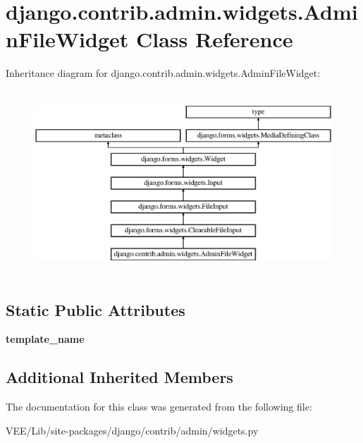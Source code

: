 \hypertarget{classdjango_1_1contrib_1_1admin_1_1widgets_1_1_admin_file_widget}{}\section{django.\+contrib.\+admin.\+widgets.\+Admin\+File\+Widget Class Reference}
\label{classdjango_1_1contrib_1_1admin_1_1widgets_1_1_admin_file_widget}
Inheritance diagram for django.\+contrib.\+admin.\+widgets.\+Admin\+File\+Widget\+:\begin{figure}[H]
\begin{center}
\leavevmode
\includegraphics[height=6.950355cm]{classdjango_1_1contrib_1_1admin_1_1widgets_1_1_admin_file_widget}
\end{center}
\end{figure}
\subsection*{Static Public Attributes}
\begin{DoxyCompactItemize}
\item 
\mbox{\label{classdjango_1_1contrib_1_1admin_1_1widgets_1_1_admin_file_widget_afaef530293b6638f6bdc5e26f5f02cc3}} 
{\bfseries template\+\_\+name}
\end{DoxyCompactItemize}
\subsection*{Additional Inherited Members}


The documentation for this class was generated from the following file\+:\begin{DoxyCompactItemize}
\item 
V\+E\+E/\+Lib/site-\/packages/django/contrib/admin/widgets.\+py\end{DoxyCompactItemize}
